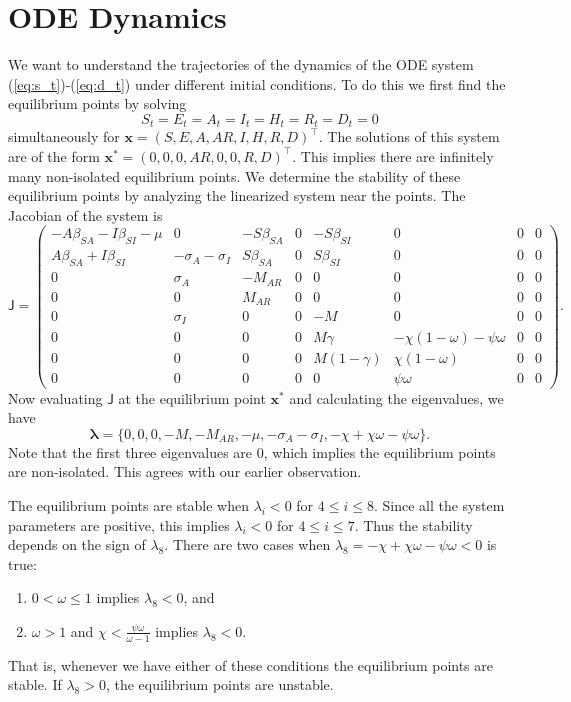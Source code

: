 \documentclass[11pt]{article}
\renewcommand\vec{\mathbf}
\newcommand{\mat}[1]{\mathsf{#1}}
\begin{document}
\section{ODE Dynamics}
	We want to understand the trajectories of the dynamics of the ODE system (\ref{eq:s_t})-(\ref{eq:d_t}) under different initial conditions.
	To do this we first find the equilibrium points by solving
	$$S_t = E_t = A_t = I_t = H_t = R_t = D_t = 0$$
	simultaneously for $\vec{x} = (S, E, A, AR, I, H, R, D)^\intercal$.
	The solutions of this system are of the form $\vec{x^*} = (0, 0 , 0, AR, 0, 0, R, D)^\intercal$.
	This implies there are infinitely many non-isolated equilibrium points.
	We determine the stability of these equilibrium points by analyzing the linearized system near the points.
	The Jacobian of the system is
	\begin{equation}
		\mat{J} = \begin{pmatrix}
			- A \beta_{SA} - I \beta_{SI} - \mu	&	0						&	- S \beta_{SA}	&	0	&	- S \beta_{SI}	&	0									&	0	&	0	\\
			A \beta_{SA} + I \beta_{SI}			&	- \sigma_A - \sigma_I	&	S \beta_{SA}	&	0	&	S \beta_{SI}	&	0									&	0	&	0	\\
			0									&	\sigma_A				&	- M_{AR}		&	0	&	0				&	0									&	0	&	0	\\
			0									&	0						&	M_{AR}			&	0	&	0				&	0									&	0	&	0	\\
			0									&	\sigma_I				&	0				&	0	&	- M				&	0									&	0	&	0	\\
			0									&	0						&	0				&	0	&	M \gamma		&	- \chi (1 - \omega) - \psi \omega	&	0	&	0	\\
			0									&	0						&	0				&	0	&	M (1 - \gamma)	&	\chi (1 - \omega)					&	0	&	0	\\
			0									&	0						&	0				&	0	&	0				&	\psi \omega							&	0	&	0
		\end{pmatrix}.
	\end{equation}
	Now evaluating $\mat{J}$ at the equilibrium point $\vec{x^*}$ and calculating the eigenvalues, we have
	\begin{equation}
		\vec{\lambda} = \{0 , 0, 0, - M, - M_{AR}, - \mu, - \sigma_A - \sigma_I, - \chi + \chi \omega - \psi \omega \}.
	\end{equation}
	Note that the first three eigenvalues are 0, which implies the equilibrium points are non-isolated.
	This agrees with our earlier observation.
	
	The equilibrium points are stable when $\lambda_i < 0$ for $4 \leq i \leq 8$.
	Since all the system parameters are positive, this implies $\lambda_i < 0$ for $4 \leq i \leq 7$.
	Thus the stability depends on the sign of $\lambda_8$.
	There are two cases when $\lambda_8 = - \chi + \chi \omega - \psi \omega < 0$ is true:
	\begin{enumerate}
		\item $0 < \omega \leq 1$ implies $\lambda_8 < 0$, and
		\item $\omega > 1$ and $\chi < \frac{\psi \omega}{\omega - 1}$ implies $\lambda_8 < 0$.
	\end{enumerate}
	That is, whenever we have either of these conditions the equilibrium points are stable.
	If $\lambda_8 > 0$, the equilibrium points are unstable.
	
\end{document}
